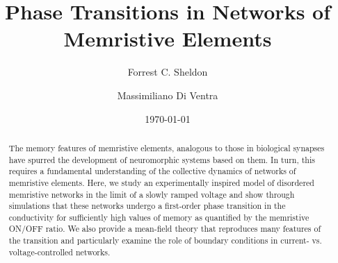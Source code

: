 \documentclass[aps,prl,reprint,groupedaddress]{revtex4-1}
\begin{document}

\title{Phase Transitions in Networks of Memristive Elements}


\author{Forrest C. Sheldon}


\author{Massimiliano Di Ventra}


\date{\today}

\begin{abstract}
The memory features of memristive elements, analogous to those in biological
synapses have spurred the development of neuromorphic systems based on them.
In turn, this requires a fundamental understanding of the collective
dynamics of networks of memristive elements.  Here, we study an experimentally
inspired model of disordered memristive networks in the limit of a slowly
ramped voltage and show through simulations that these networks undergo a
first-order phase transition in the conductivity for sufficiently high
values of memory as quantified by the memristive ON/OFF ratio. We also
provide a mean-field theory that reproduces many features of the transition
and particularly examine the role of boundary conditions in current- vs.
voltage-controlled networks.
\end{abstract}
\end{document}
